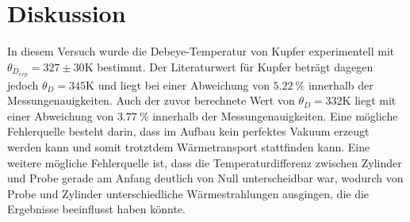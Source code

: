 \section{Diskussion}
In diesem Versuch wurde die Debeye-Temperatur von Kupfer experimentell mit \\$\theta_{D_{exp}} = 327 \pm 30 \si{\kelvin}$ bestimmt.
Der Literaturwert für Kupfer beträgt dagegen jedoch $\theta_{D} = 345 \si{\kelvin}$ und liegt bei einer Abweichung von $\SI{5.22}{\%}$ innerhalb der Messungenauigkeiten.
Auch der zuvor berechnete Wert von $\theta_{D} = 332 \si{\kelvin}$ liegt mit einer Abweichung von $\SI{3.77}{\%}$ innerhalb der Messungenauigkeiten.
Eine mögliche Fehlerquelle besteht darin, dass im Aufbau kein perfektes Vakuum erzeugt werden kann und somit trotztdem Wärmetransport stattfinden kann.
Eine weitere mögliche Fehlerquelle ist, dass die Temperaturdifferenz zwischen Zylinder und Probe gerade am Anfang deutlich von Null unterscheidbar war, wodurch von Probe und Zylinder unterschiedliche Wärmestrahlungen ausgingen, die die Ergebnisse beeinflusst haben könnte.
